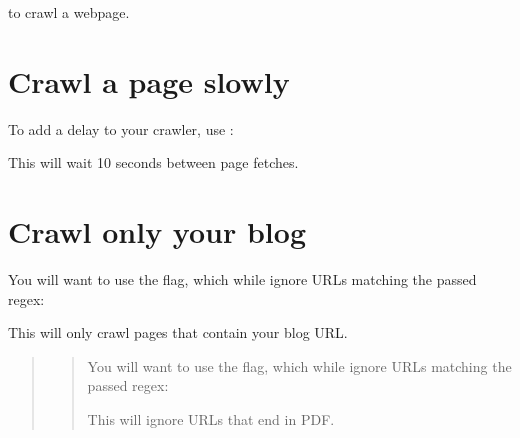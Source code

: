 \documentclass[letterpaper,10pt,english]{sphinxmanual}
\begin{document}
%
\begin{sphinxVerbatim}[commandchars=\\\{\}]
 
\end{sphinxVerbatim}

to crawl a webpage.


\section{Crawl a page slowly}
\label{\detokenize{cookbook:crawl-a-page-slowly}}
To add a delay to your crawler,
use :

%
\begin{sphinxVerbatim}[commandchars=\\\{\}]
   
\end{sphinxVerbatim}

This will wait 10 seconds between page fetches.


\section{Crawl only your blog}
\label{\detokenize{cookbook:crawl-only-your-blog}}
You will want to use the  flag,
which while ignore URLs matching the passed regex:

%
\begin{sphinxVerbatim}[commandchars=\\\{\}]
   
\end{sphinxVerbatim}

This will only crawl pages that contain your blog URL.
\begin{quote}
\begin{quote}

You will want to use the  flag,
which while ignore URLs matching the passed regex:

%
\begin{sphinxVerbatim}[commandchars=\\\{\}]
   
\end{sphinxVerbatim}

This will ignore URLs that end in PDF.
\end{quote}
\end{quote}
\end{document}
